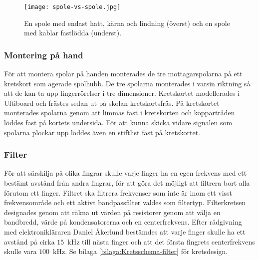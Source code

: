 \documentclass[a4paper]{article}
\begin{document}
\begin{sloppypar}
    \begin{figure}[H]
        \centering
        \texttt{[image: spole-vs-spole.jpg]}
        \caption{En spole med endast hatt, kärna och lindning (överst) och en spole med kablar fastlödda (underst).}
        \label{fig:SpoleVsSpole}
    \end{figure}


    \subsubsection{Montering på hand} %
    För att montera spolar på handen monterades de tre mottagarspolarna på ett kretskort som agerade spolhubb.
    De tre spolarna monterades i varsin riktning så att de kan ta upp fingerrörelser i tre dimensioner.
    Kretskortet modellerades i Ultiboard och frästes sedan ut på skolan kretskortsfräs.
    På kretskortet monterades spolarna genom att limmas fast i kretskorten och koppartråden löddes fast på kortets undersida.
    För att kunna skicka vidare signalen som spolarna plockar upp löddes även en stiftlist fast på kretskortet.


    \subsubsection{Filter}
    För att särskilja på olika fingrar skulle varje finger ha en egen frekvens med ett bestämt avstånd från andra fingrar, för att göra det möjligt att filtrera bort alla förutom ett finger.
    Filtret ska filtrera frekvenser som inte är inom ett visst frekvensområde och ett aktivt bandpassfilter valdes som filtertyp.
    Filterkretsen designades genom att räkna ut värden på resistorer genom att välja en bandbredd, värde på kondensatorerna och en centerfrekvens.
    Efter rådgivning med elektronikläraren Daniel Åkerlund bestämdes att varje finger skulle ha ett avstånd på cirka $15$~kHz till nästa finger och att det första fingrets centerfrekvens skulle vara $100$~kHz.
    Se bilaga \ref{bilaga:Kretsschema-filter} för kretsdesign.


\end{sloppypar}
\end{document}
